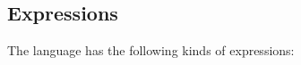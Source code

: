\documentclass[11pt]{article}
\newcommand{\mathsc}[1]{\bm{\mathsf{#1}}}
\newcommand{\typebool}{\ensuremath{\mathsc{bool}}\xspace}
\newcommand{\typeint}{\ensuremath{\mathsc{int}}\xspace}
\newcommand{\typefloat}{\ensuremath{\mathsc{float}}\xspace}
\newcommand{\typeref}[1]{\ensuremath{\mathsc{ref}~#1}\xspace}
\newcommand{\typefn}[2]{\ensuremath{(#1)\rightarrow #2}\xspace}
\begin{document}






\subsection{Expressions}

The language has the following kinds of expressions:
\end{document}
